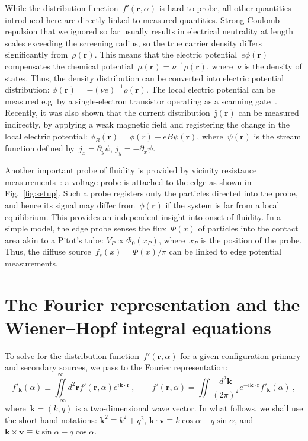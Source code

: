 \documentclass[preprint,aps,eqsecnum]{revtex4-1}
\begin{document}
While the distribution
function~$f'({\bm r}, \alpha)$ is hard to probe, all other quantities
introduced here are directly linked to measured quantities.
Strong Coulomb repulsion
that we ignored so far usually  results in electrical neutrality
at length scales exceeding the screening radius, so the true carrier
density differs significantly from~$\rho({\bm r})$. This means that
the electric potential~$e\phi({\bm r})$ compensates the chemical
potential~$\mu({\bm r}) = \nu^{-1} \rho({\bm r})$, where~$\nu$
is the density of states. Thus, the density distribution can be converted
into electric
potential distribution: $\phi({\bm r}) = - (\nu e)^{-1} \rho({\bm r})$.
The local electric potential can be measured e.g. by a single-electron
transistor operating as a scanning gate~\cite{bib:Ilani}. Recently, it was
also shown\cite{bib:Measuring-Psi}
that the current distribution~${\bm j}({\bm r})$
can be measured indirectly, by applying
a weak magnetic field and registering the change in the local electric
potential: $\phi_B({\bm r}) = \phi(r) - eB \psi({\bm r})$,
where~$\psi({\bm r})$ is the stream function defined
by~$j_x = \partial_y \psi$, $j_y= -\partial_x \psi$.

Another important probe of fluidity is provided by
vicinity resistance measurements~\cite{bib:Bandurin, bib:Ensslin}:
a voltage probe is attached to the edge as shown in
Fig.~\ref{fig:setup}. Such a probe
registers only the particles directed into the probe, and hence
its signal may differ from~$\phi({\bm r})$ if the system is far from a
local equilibrium.  This provides an
independent insight into onset of fluidity. In a simple model, the
edge probe senses the flux~$\Phi(x)$ of particles into the contact area
akin to a Pitot's tube:
$V_P \propto \Phi_0(x_P)$, where~$x_P$ is the position of the probe.
Thus, the diffuse source~$f_s(x) = \Phi(x)/\pi$ can be linked to edge
potential measurements.


\section{The Fourier representation and the Wiener--Hopf integral equations}
\label{sec:fourier-wh}
To solve for the distribution function~$f'({\bm r}, \alpha)$ for a given configuration primary and
secondary sources,  we pass to the Fourier representation:
\begin{equation}
  \label{eq:fourier-definition}
  f'_{\bm k}(\alpha) \equiv \iint\limits_{-\infty}^{\infty}
   d^2{\bm r} f'({\bm r}, \alpha)
  e^{i {\bm k} \cdot{\bm r}}
  \ ,
  \qquad
  f'({\bm r}, \alpha) =
  \iint \frac{d^2 {\bm k}}{(2\pi)^2} e^{-i {\bm k}\cdot{\bm r}} f'_{\bm k}(\alpha)
  \ ,
\end{equation}
where~${\bm k} = (k, q)$ is a two-dimensional wave vector. In what follows,
we shall use the short-hand notations: ${\bm k}^2 \equiv k^2 + q^2$,
${\bm k}\cdot{\bm v} \equiv k \cos \alpha + q \sin\alpha$,
and~${\bm k}\times{\bm v} \equiv k \sin\alpha - q \cos\alpha$.
\end{document}
